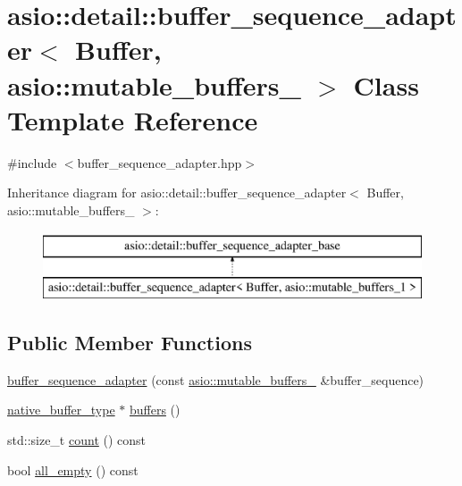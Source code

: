 \hypertarget{classasio_1_1detail_1_1buffer__sequence__adapter_3_01_buffer_00_01asio_1_1mutable__buffers__1_01_4}{}\section{asio\+:\+:detail\+:\+:buffer\+\_\+sequence\+\_\+adapter$<$ Buffer, asio\+:\+:mutable\+\_\+buffers\+\_ $>$ Class Template Reference}
\label{classasio_1_1detail_1_1buffer__sequence__adapter_3_01_buffer_00_01asio_1_1mutable__buffers__1_01_4}


{\ttfamily \#include $<$buffer\+\_\+sequence\+\_\+adapter.\+hpp$>$}

Inheritance diagram for asio\+:\+:detail\+:\+:buffer\+\_\+sequence\+\_\+adapter$<$ Buffer, asio\+:\+:mutable\+\_\+buffers\+\_ $>$\+:\begin{figure}[H]
\begin{center}
\leavevmode
\includegraphics[height=2.000000cm]{classasio_1_1detail_1_1buffer__sequence__adapter_3_01_buffer_00_01asio_1_1mutable__buffers__1_01_4}
\end{center}
\end{figure}
\subsection*{Public Member Functions}
\begin{DoxyCompactItemize}
\item 
\hyperlink{classasio_1_1detail_1_1buffer__sequence__adapter_3_01_buffer_00_01asio_1_1mutable__buffers__1_01_4_ab715e3ff9e43b4182850edd18a0881fb}{buffer\+\_\+sequence\+\_\+adapter} (const \hyperlink{classasio_1_1mutable__buffers__1}{asio\+::mutable\+\_\+buffers\+\_} \&buffer\+\_\+sequence)
\item 
\hyperlink{classasio_1_1detail_1_1buffer__sequence__adapter__base_a91d037bd052777b8df514e6b94ec9e71}{native\+\_\+buffer\+\_\+type} $\ast$ \hyperlink{classasio_1_1detail_1_1buffer__sequence__adapter_3_01_buffer_00_01asio_1_1mutable__buffers__1_01_4_a733a54bcebd97991f3c5c3ae69e04699}{buffers} ()
\item 
std\+::size\+\_\+t \hyperlink{classasio_1_1detail_1_1buffer__sequence__adapter_3_01_buffer_00_01asio_1_1mutable__buffers__1_01_4_a0152edf9af0e26deaec749c36fe577ab}{count} () const 
\item 
bool \hyperlink{classasio_1_1detail_1_1buffer__sequence__adapter_3_01_buffer_00_01asio_1_1mutable__buffers__1_01_4_a7ac1bbac57dbb04eb13bc7a4df5de728}{all\+\_\+empty} () const 
\end{DoxyCompactItemize}
